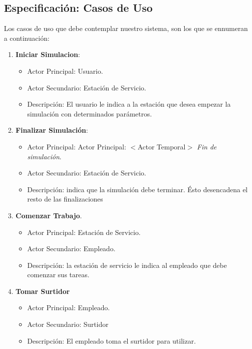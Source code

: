 \documentclass[a4paper,12pt]{article}
\begin{document}
\subsection{Especificación: Casos de Uso}

Los casos de uso que debe contemplar nuestro sistema, son los que se ennumeran a continuación:

\begin{enumerate}
	\item \textbf{Iniciar Simulacion}:
	\begin{itemize}
		\item Actor Principal: Usuario.
		\item Actor Secundario: Estación de Servicio.
		\item Descripción: El usuario le indica a la estación que desea empezar la simulación con
		 determinados parámetros.
	\end{itemize}
	
	\item \textbf{Finalizar Simulación}:
	\begin{itemize}
		\item Actor Principal: Actor Principal: $<$Actor Temporal$>$ \textit{Fin de simulación}.
		\item Actor Secundario: Estación de Servicio.
		\item Descripción: indica que la simulación debe terminar. Ésto desencadena el resto de las
		 finalizaciones
	\end{itemize}

\newpage
	
	\item \textbf{Comenzar Trabajo}. 
		\begin{itemize}
		\item Actor Principal: Estación de Servicio.
		\item Actor Secundario: Empleado.
		\item Descripción: la estación de servicio le indica al empleado que debe comenzar sus tareas.
	\end{itemize}
		
	\item \textbf{Tomar Surtidor}
	\begin{itemize}
		\item Actor Principal: Empleado.
		\item Actor Secundario: Surtidor
		\item Descripción: El empleado toma el surtidor para utilizar.
	\end{itemize}
	

\end{enumerate}
\end{document}
